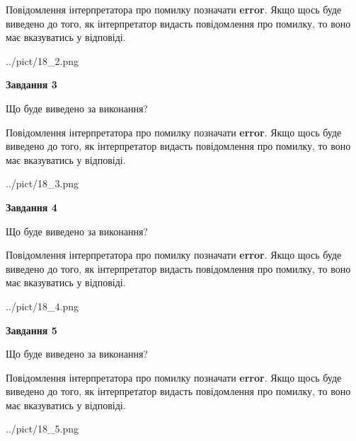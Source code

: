 \documentclass[12pt, ukrainian]{article}
\begin{document}
{\begin {large}
Повідомлення інтерпретатора про помилку позначати \textbf{error}.
Якщо щось буде виведено до того, як інтерпретатор видасть повідомлення про помилку, 
то воно має вказуватись у відповіді. \par


\begin{center}
	{../pict/18_2.png}
\end{center}
\newpage

{\begin {center}\textbf{Завдання 3}\end {center}}\par
Що буде виведено за виконання?

Повідомлення інтерпретатора про помилку позначати \textbf{error}.
Якщо щось буде виведено до того, як інтерпретатор видасть повідомлення про помилку, 
то воно має вказуватись у відповіді. \par


\begin{center}
	{../pict/18_3.png}
\end{center}
\newpage

{\begin {center}\textbf{Завдання 4}\end {center}}\par
Що буде виведено за виконання?

Повідомлення інтерпретатора про помилку позначати \textbf{error}.
Якщо щось буде виведено до того, як інтерпретатор видасть повідомлення про помилку, 
то воно має вказуватись у відповіді. \par


\begin{center}
	{../pict/18_4.png}
\end{center}
\newpage

{\begin {center}\textbf{Завдання 5}\end {center}}\par
Що буде виведено за виконання?

Повідомлення інтерпретатора про помилку позначати \textbf{error}.
Якщо щось буде виведено до того, як інтерпретатор видасть повідомлення про помилку, 
то воно має вказуватись у відповіді. \par


\begin{center}
	{../pict/18_5.png}
\end{center}
\newpage


\end{large}}
\end{document}
